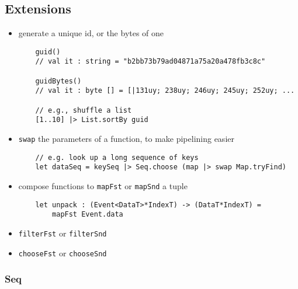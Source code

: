 \documentclass{article}
\begin{document}
\subsection{Extensions}

\begin{itemize}
\item generate a unique id, or the bytes of one
\begin{verbatim}
    guid()
    // val it : string = "b2bb73b79ad04871a75a20a478fb3c8c"

    guidBytes()
    // val it : byte [] = [|131uy; 238uy; 246uy; 245uy; 252uy; ...

    // e.g., shuffle a list
    [1..10] |> List.sortBy guid
\end{verbatim}


\item \texttt{swap} the parameters of a function, to make pipelining easier
\begin{verbatim}
    // e.g. look up a long sequence of keys
    let dataSeq = keySeq |> Seq.choose (map |> swap Map.tryFind)
\end{verbatim}

\item compose functions to \texttt{mapFst} or \texttt{mapSnd} a tuple
\begin{verbatim}
    let unpack : (Event<DataT>*IndexT) -> (DataT*IndexT) =
        mapFst Event.data
\end{verbatim}

\item \texttt{filterFst} or \texttt{filterSnd}

\item \texttt{chooseFst} or \texttt{chooseSnd}

\end{itemize}

\subsubsection{Seq}
\end{document}
